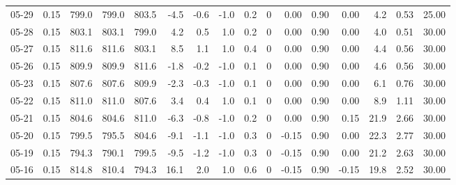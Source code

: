 \begin{threeparttable}
{\begin{tabular}{lrrrrrrrrrrrrrrr}
  05-29 &     0.15 & 799.0 & 799.0 & 803.5 &       -4.5 &           -0.6 &                     -1.0 &                 0.2 &              0 &       0.00 &      0.90 &           0.00 &              4.2 &            0.53 &                  25.00 \\
  05-28 &     0.15 & 803.1 & 803.1 & 799.0 &        4.2 &            0.5 &                      1.0 &                 0.2 &              0 &       0.00 &      0.90 &           0.00 &              4.0 &            0.51 &                  30.00 \\
  05-27 &     0.15 & 811.6 & 811.6 & 803.1 &        8.5 &            1.1 &                      1.0 &                 0.4 &              0 &       0.00 &      0.90 &           0.00 &              4.4 &            0.56 &                  30.00 \\
  05-26 &     0.15 & 809.9 & 809.9 & 811.6 &       -1.8 &           -0.2 &                     -1.0 &                 0.1 &              0 &       0.00 &      0.90 &           0.00 &              4.6 &            0.56 &                  30.00 \\
  05-23 &     0.15 & 807.6 & 807.6 & 809.9 &       -2.3 &           -0.3 &                     -1.0 &                 0.1 &              0 &       0.00 &      0.90 &           0.00 &              6.1 &            0.76 &                  30.00 \\
  05-22 &     0.15 & 811.0 & 811.0 & 807.6 &        3.4 &            0.4 &                      1.0 &                 0.1 &              0 &       0.00 &      0.90 &           0.00 &              8.9 &            1.11 &                  30.00 \\
  05-21 &     0.15 & 804.6 & 804.6 & 811.0 &       -6.3 &           -0.8 &                     -1.0 &                 0.2 &              0 &       0.00 &      0.90 &           0.15 &             21.9 &            2.66 &                  30.00 \\
  05-20 &     0.15 & 799.5 & 795.5 & 804.6 &       -9.1 &           -1.1 &                     -1.0 &                 0.3 &              0 &      -0.15 &      0.90 &           0.00 &             22.3 &            2.77 &                  30.00 \\
  05-19 &     0.15 & 794.3 & 790.1 & 799.5 &       -9.5 &           -1.2 &                     -1.0 &                 0.3 &              0 &      -0.15 &      0.90 &           0.00 &             21.2 &            2.63 &                  30.00 \\
  05-16 &     0.15 & 814.8 & 810.4 & 794.3 &       16.1 &            2.0 &                      1.0 &                 0.6 &              0 &      -0.15 &      0.90 &          -0.15 &             19.8 &            2.52 &                  30.00 \\

\end{tabular}}
\end{threeparttable}
